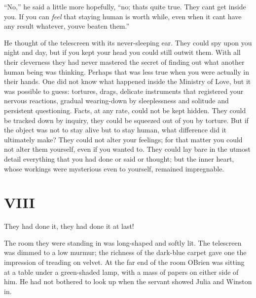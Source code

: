 ``No,'' he said a little more hopefully, ``no; that\textquotesingle s quite
true. They can\textquotesingle t get inside you. If you can \emph{feel}
that staying human is worth while, even when it can\textquotesingle t
have any result whatever, you\textquotesingle ve beaten them.''

He thought of the telescreen with its never-sleeping ear. They could spy
upon you night and day, but if you kept your head you could still outwit
them. With all their cleverness they had never mastered the secret of
finding out what another human being was thinking. Perhaps that was less
true when you were actually in their hands. One did not know what
happened inside the Ministry of Love, but it was possible to guess:
tortures, drags, delicate instruments that registered your nervous
reactions, gradual wearing-down by sleeplessness and solitude and
persistent questioning. Facts, at any rate, could not be kept hidden.
They could be tracked down by inquiry, they could be squeezed out of you
by torture. But if the object was not to stay alive but to stay human,
what difference did it ultimately make? They could not alter your
feelings; for that matter you could not alter them yourself, even if you
wanted to. They could lay bare in the utmost detail everything that you
had done or said or thought; but the inner heart, whose workings were
mysterious even to yourself, remained impregnable.


\section{VIII}\label{viii-1}

They had done it, they had done it at last!

The room they were standing in was long-shaped and softly lit. The
telescreen was dimmed to a low murmur; the richness of the dark-blue
carpet gave one the impression of treading on velvet. At the far end of
the room O\textquotesingle Brien was sitting at a table under a
green-shaded lamp, with a mass of papers on either side of him. He had
not bothered to look up when the servant showed Julia and Winston in.

